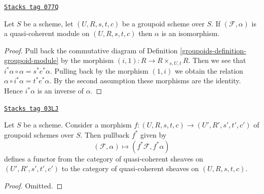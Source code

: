 \begin{lemma}[Isomorphism]
\label{groupoids-lemma-isomorphism}
\href{https://stacks.math.columbia.edu/tag/077Q}{\texttt{Stacks tag 077Q}}

Let $S$ be a scheme, let $(U, R, s, t, c)$ be a groupoid scheme over $S$.
If $(\mathcal{F}, \alpha)$ is a quasi-coherent module on $(U, R, s, t, c)$
then $\alpha$ is an isomorphism.
\end{lemma}

\begin{proof}

Pull back the commutative diagram of
Definition \ref{groupoids-definition-groupoid-module}
by the morphism $(i, 1) : R \to R \times_{s, U, t} R$.
Then we see that $i^*\alpha \circ \alpha = s^*e^*\alpha$.
Pulling back by the morphism $(1, i)$ we obtain the relation
$\alpha \circ i^*\alpha = t^*e^*\alpha$. By the second assumption
these morphisms are the identity. Hence $i^*\alpha$ is an inverse of
$\alpha$.
\end{proof}

\begin{lemma}[Pullback]
\label{groupoids-lemma-pullback}
\href{https://stacks.math.columbia.edu/tag/03LJ}{\texttt{Stacks tag 03LJ}}

Let $S$ be a scheme. Consider a morphism
$f : (U, R, s, t, c) \to (U', R', s', t', c')$
of groupoid schemes over $S$. Then pullback $f^*$ given by
$$
(\mathcal{F}, \alpha) \mapsto (f^*\mathcal{F}, f^*\alpha)
$$
defines a functor from the category of quasi-coherent sheaves on
$(U', R', s', t', c')$ to the category of quasi-coherent sheaves on
$(U, R, s, t, c)$.
\end{lemma}

\begin{proof}
Omitted.
\end{proof}

